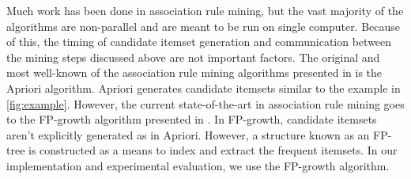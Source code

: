 \documentclass[11pt]{article}
\begin{document}
Much work has been done in association rule mining, but the vast
majority of the algorithms are non-parallel and are meant to be run on
single computer. Because of this, the timing of candidate itemset generation and
communication between the mining steps discussed above are not
important factors. The original and most well-known of the association
rule mining algorithms presented in \cite{Agrawal1} is the Apriori
algorithm. Apriori generates candidate itemsets similar to the example
in \ref{fig:example}. However, the current state-of-the-art in
association rule mining goes to the FP-growth algorithm presented in
\cite{Han}. In FP-growth, candidate itemsets aren't explicitly
generated as in Apriori. However, a structure known as an FP-tree is
constructed as a means to index and extract the frequent itemsets. In
our implementation and experimental evaluation, we use the FP-growth
algorithm. 
\end{document}
